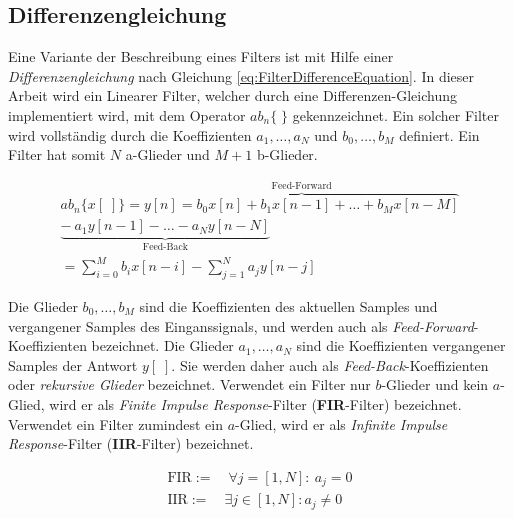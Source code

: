\subsection{Differenzengleichung}
\label{sec:differenzengleichung}

Eine Variante der Beschreibung eines Filters ist mit Hilfe einer \emph{Differenzengleichung} nach Gleichung \ref{eq:FilterDifferenceEquation}. In dieser Arbeit wird ein Linearer Filter, welcher durch eine Differenzen-Gleichung implementiert wird, mit dem Operator $ab_n\{\;\}$ gekennzeichnet. Ein solcher Filter wird vollständig durch die Koeffizienten $a_1 ,\ldots, a_N$ und $b_0 ,\ldots, b_M$  definiert. Ein Filter hat somit $N$ a-Glieder und $M+1$ b-Glieder.  \cite[\glqq Difference Equation\grqq]{introductionToFilters}

 \begin{equation}
\begin{split}
ab_n\{x[\;]\}= \overbrace{y[n] = b_0 x[n] + b_1 x[n-1] + \ldots +b_M x[n-M]}^\text{Feed-Forward} \\
\underbrace{-\ a_1 y[n-1] - \ldots - a_N y[n-N]}_\text{Feed-Back} \\
 = \sum_{i=0}^{M} b_i x[n-i] - \sum_{j=1}^{N} a_j y[n-j]
\end{split}
\label{eq:FilterDifferenceEquation}
\end{equation}

Die Glieder $b_0 ,\ldots, b_M$ sind die Koeffizienten des aktuellen Samples und vergangener Samples des Einganssignals, und werden auch als \emph{Feed-Forward}-Koeffizienten bezeichnet. Die Glieder $a_1 ,\ldots, a_N$ sind die Koeffizienten vergangener Samples der Antwort $y[\;]$. Sie werden daher auch als \emph{Feed-Back}-Koeffizienten oder \emph{rekursive Glieder} bezeichnet. Verwendet ein Filter nur $b$-Glieder und kein $a$-Glied, wird er als \emph{Finite Impulse Response}-Filter (\textbf{FIR}-Filter) bezeichnet. Verwendet ein Filter zumindest ein $a$-Glied, wird er als \emph{Infinite Impulse Response}-Filter (\textbf{IIR}-Filter) bezeichnet.\cite[\glqq Difference Equation\grqq]{introductionToFilters}

 \begin{equation}
\begin{gathered}
\text{FIR} := \quad \forall j = [1,N] :\ a_j = 0 \\
\text{IIR} := \quad \exists j \in [1,N]:  a_j \neq 0
\end{gathered}
\label{eq:FilterDifferenceEquation}
\end{equation}

